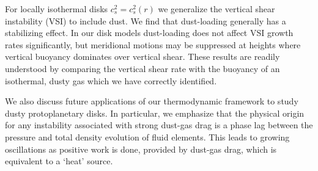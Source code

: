 
For locally isothermal disks $c^2_s=c_s^2(r)$ we generalize the vertical
shear instability (VSI) to include dust. We find that dust-loading
generally has a stabilizing effect. In our disk models
dust-loading does not affect VSI growth rates significantly, but
meridional motions may be suppressed at heights where vertical 
buoyancy dominates over vertical shear. These results are readily
understood by comparing the vertical shear rate with the buoyancy of
an isothermal, dusty gas which we have correctly identified. 

We also discuss future applications of our thermodynamic framework to 
study dusty protoplanetary disks. In particular, we emphasize  that the 
physical origin for any instability associated with strong dust-gas
drag is a phase lag between the pressure and total density evolution
of fluid elements. This leads to growing oscillations as positive work
is done, provided by dust-gas drag, which is equivalent to a `heat'
source. %
 
